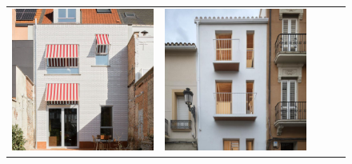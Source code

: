\begin{figure}[H]
{\begin{tabular}{@{}ccccc@{}}
      \includegraphics[width=\linewidth]{Images/LoRAs/3D-effect/Training_images/3.jpg} &
      \includegraphics[width=\linewidth]{Images/LoRAs/3D-effect/Training_images/4.jpg} &

\end{tabular}}
\end{figure}
